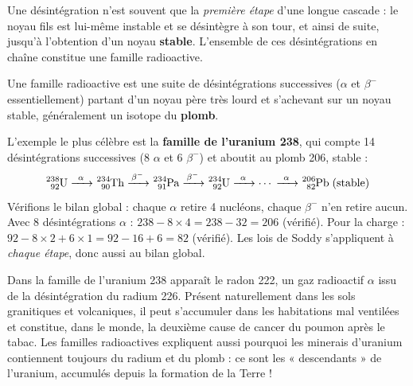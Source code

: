 \documentclass[11pt]{article}
\newcommand{\cle}[1]{{\popxbold\color{popdark}#1}}
\begin{document}
Une désintégration n'est souvent que la \emph{première étape} d'une longue cascade : le noyau fils est lui-même instable et se désintègre à son tour, et ainsi de suite, jusqu'à l'obtention d'un noyau \textbf{stable}. L'ensemble de ces désintégrations en chaîne constitue une \cle{famille radioactive}.

\begin{definition}
Une famille radioactive est une suite de désintégrations successives ($\alpha$ et $\beta^-$ essentiellement) partant d'un noyau père très lourd et s'achevant sur un noyau stable, généralement un isotope du \textbf{plomb}.
\end{definition}

L'exemple le plus célèbre est la \textbf{famille de l'uranium 238}, qui compte 14 désintégrations successives (8 $\alpha$ et 6 $\beta^-$) et aboutit au plomb 206, stable :
\[ \ce{^{238}_{92}U ->[$\alpha$] ^{234}_{90}Th ->[$\beta^-$] ^{234}_{91}Pa ->[$\beta^-$] ^{234}_{92}U ->[$\alpha$] $\cdots$ ->[$\alpha$] ^{206}_{82}Pb} \; \text{(stable)} \]
Vérifions le bilan global : chaque $\alpha$ retire 4 nucléons, chaque $\beta^-$ n'en retire aucun. Avec 8 désintégrations $\alpha$ : $238 - 8 \times 4 = 238 - 32 = 206$ (vérifié). Pour la charge : $92 - 8 \times 2 + 6 \times 1 = 92 - 16 + 6 = 82$ (vérifié). Les lois de Soddy s'appliquent à \emph{chaque étape}, donc aussi au bilan global.

\begin{savaistu}
Dans la famille de l'uranium 238 apparaît le radon 222, un gaz radioactif $\alpha$ issu de la désintégration du radium 226. Présent naturellement dans les sols granitiques et volcaniques, il peut s'accumuler dans les habitations mal ventilées et constitue, dans le monde, la deuxième cause de cancer du poumon après le tabac. Les familles radioactives expliquent aussi pourquoi les minerais d'uranium contiennent toujours du radium et du plomb : ce sont les « descendants » de l'uranium, accumulés depuis la formation de la Terre !
\end{savaistu}
\end{document}
